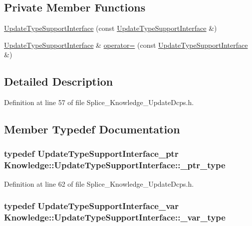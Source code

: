 \subsection*{Private Member Functions}
\begin{DoxyCompactItemize}
\item 
\hyperlink{classKnowledge_1_1UpdateTypeSupportInterface_a6a035181e1eb882e298d706836438a25}{UpdateTypeSupportInterface} (const \hyperlink{classKnowledge_1_1UpdateTypeSupportInterface}{UpdateTypeSupportInterface} \&)
\item 
\hyperlink{classKnowledge_1_1UpdateTypeSupportInterface}{UpdateTypeSupportInterface} \& \hyperlink{classKnowledge_1_1UpdateTypeSupportInterface_a59857b726da38c38957a6a492cf08d28}{operator=} (const \hyperlink{classKnowledge_1_1UpdateTypeSupportInterface}{UpdateTypeSupportInterface} \&)
\end{DoxyCompactItemize}


\subsection{Detailed Description}


Definition at line 57 of file Splice\_\-Knowledge\_\-UpdateDcps.h.



\subsection{Member Typedef Documentation}
\hypertarget{classKnowledge_1_1UpdateTypeSupportInterface_a35b969e998255d5c4a68cf2887debd92}{
\subsubsection[{\_\-ptr\_\-type}]{\setlength{\rightskip}{0pt plus 5cm}typedef {\bf UpdateTypeSupportInterface\_\-ptr} {\bf Knowledge::UpdateTypeSupportInterface::\_\-ptr\_\-type}}}
\label{d6/d97/classKnowledge_1_1UpdateTypeSupportInterface_a35b969e998255d5c4a68cf2887debd92}


Definition at line 62 of file Splice\_\-Knowledge\_\-UpdateDcps.h.

\hypertarget{classKnowledge_1_1UpdateTypeSupportInterface_afb29ad9f293bdad6236737eeb811774a}{
\subsubsection[{\_\-var\_\-type}]{\setlength{\rightskip}{0pt plus 5cm}typedef {\bf UpdateTypeSupportInterface\_\-var} {\bf Knowledge::UpdateTypeSupportInterface::\_\-var\_\-type}}}
\label{d6/d97/classKnowledge_1_1UpdateTypeSupportInterface_afb29ad9f293bdad6236737eeb811774a}


